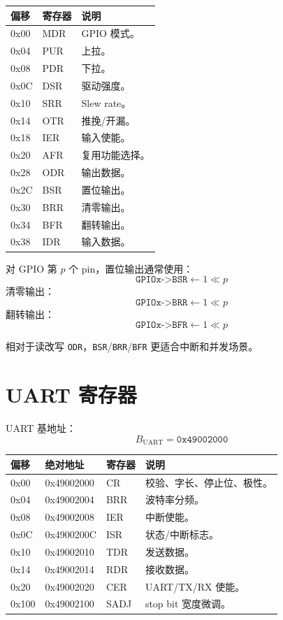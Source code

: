 \documentclass[UTF8,a4paper,11pt]{ctexart}
\newcommand{\addr}[1]{\texttt{#1}}
\newcommand{\reg}[1]{\texttt{#1}}
\begin{document}
\begin{longtable}{>{\ttfamily}p{2cm}p{3cm}p{8cm}}
\toprule
偏移 & 寄存器 & 说明 \\
\midrule
\endhead
0x00 & MDR & GPIO 模式。\\
0x04 & PUR & 上拉。\\
0x08 & PDR & 下拉。\\
0x0C & DSR & 驱动强度。\\
0x10 & SRR & Slew rate。\\
0x14 & OTR & 推挽/开漏。\\
0x18 & IER & 输入使能。\\
0x20 & AFR & 复用功能选择。\\
0x28 & ODR & 输出数据。\\
0x2C & BSR & 置位输出。\\
0x30 & BRR & 清零输出。\\
0x34 & BFR & 翻转输出。\\
0x38 & IDR & 输入数据。\\
\bottomrule
\end{longtable}

对 GPIO 第 $p$ 个 pin，置位输出通常使用：
\[
  \reg{GPIOx->BSR} \gets 1 \ll p
\]
清零输出：
\[
  \reg{GPIOx->BRR} \gets 1 \ll p
\]
翻转输出：
\[
  \reg{GPIOx->BFR} \gets 1 \ll p
\]

相对于读改写 \reg{ODR}，\reg{BSR}/\reg{BRR}/\reg{BFR} 更适合中断和并发场景。

\section{UART 寄存器}

UART 基地址：
\[
  B_{\mathrm{UART}} = \addr{0x49002000}
\]

\begin{longtable}{>{\ttfamily}p{2cm}>{\ttfamily}p{3cm}p{2.5cm}p{6cm}}
\toprule
偏移 & 绝对地址 & 寄存器 & 说明 \\
\midrule
\endhead
0x00 & 0x49002000 & CR & 校验、字长、停止位、极性。\\
0x04 & 0x49002004 & BRR & 波特率分频。\\
0x08 & 0x49002008 & IER & 中断使能。\\
0x0C & 0x4900200C & ISR & 状态/中断标志。\\
0x10 & 0x49002010 & TDR & 发送数据。\\
0x14 & 0x49002014 & RDR & 接收数据。\\
0x20 & 0x49002020 & CER & UART/TX/RX 使能。\\
0x100 & 0x49002100 & SADJ & stop bit 宽度微调。\\
\bottomrule
\end{longtable}
\end{document}
